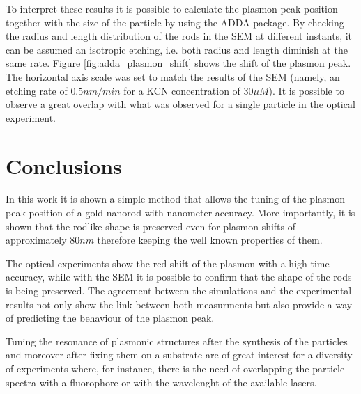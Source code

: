 \documentclass[twocolumn]{article}
\begin{document}
To interpret these results it is possible to calculate the plasmon peak position
together with the size of the particle by using the ADDA package. By checking
the radius and length distribution of the rods in the SEM at different instants, 
it can be assumed an isotropic etching, i.e. both radius and length diminish at
the same rate. Figure \ref{fig:adda_plasmon_shift} shows the shift of the
plasmon peak. The horizontal axis scale was set to match the results of the SEM
(namely, an etching rate of $0.5nm/min$ for a KCN concentration of $30\mu M$).
It is possible to observe a great overlap with what was observed for a single
particle in the optical experiment. 

\section{Conclusions}
In this work it is shown a simple method that allows the tuning of the plasmon
peak position of a gold nanorod with nanometer accuracy. More importantly, it is
shown that the rodlike shape is preserved even for plasmon shifts of
approximately $80nm$ therefore keeping the well known properties of them. 

The optical experiments show the red-shift of the plasmon with a high time
accuracy, while with the SEM it is possible to confirm that the shape of the
rods is being preserved. The agreement between the simulations and the
experimental results not only show the link between both measurments but also
provide a way of predicting the behaviour of the plasmon peak. 

Tuning the resonance of plasmonic structures after the synthesis of the
particles and moreover after fixing them on a substrate are of great interest
for a diversity of experiments where, for instance, there is the need of
overlapping the particle spectra with a fluorophore or with the wavelenght of
the available lasers.
\end{document}
